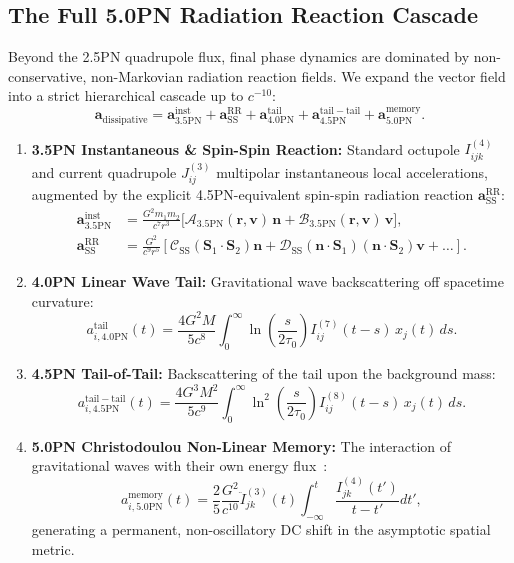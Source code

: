 \documentclass[11pt,a4paper,reqno]{article}
\theoremstyle{plain}
\theoremstyle{definition}
\theoremstyle{remark}
\numberwithin{equation}{section}
\begin{document}
\subsection{The Full 5.0PN Radiation Reaction Cascade}
Beyond the 2.5PN quadrupole flux, final phase dynamics are dominated by non-conservative, non-Markovian radiation reaction fields. We expand the vector field into a strict hierarchical cascade up to $c^{-10}$:
\begin{equation}
\label{eq:diss_field_cascade}
\bm{a}_{\mathrm{dissipative}} = \bm{a}_{3.5\mathrm{PN}}^{\mathrm{inst}} + \bm{a}_{\mathrm{SS}}^{\mathrm{RR}} + \bm{a}_{4.0\mathrm{PN}}^{\mathrm{tail}} + \bm{a}_{4.5\mathrm{PN}}^{\mathrm{tail-tail}} + \bm{a}_{5.0\mathrm{PN}}^{\mathrm{memory}}.
\end{equation}
\begin{enumerate}
    \item \textbf{3.5PN Instantaneous \& Spin-Spin Reaction:} Standard octupole $I_{ijk}^{(4)}$ and current quadrupole $J_{ij}^{(3)}$ multipolar instantaneous local accelerations, augmented by the explicit 4.5PN-equivalent spin-spin radiation reaction $\bm{a}_{\mathrm{SS}}^{\mathrm{RR}}$:
    \begin{align}
    \bm{a}_{3.5\mathrm{PN}}^{\mathrm{inst}} &= \frac{G^2 m_1 m_2}{c^7 r^3} \Big[ \mathcal{A}_{3.5\mathrm{PN}}(\bm{r}, \bm{v}) \, \bm{n} + \mathcal{B}_{3.5\mathrm{PN}}(\bm{r}, \bm{v}) \, \bm{v} \Big], \\
    \bm{a}_{\mathrm{SS}}^{\mathrm{RR}} &= \frac{G^2}{c^9 r^5} \left[ \mathcal{C}_{\mathrm{SS}}(\bm{S}_1 \cdot \bm{S}_2) \bm{n} + \mathcal{D}_{\mathrm{SS}} (\bm{n} \cdot \bm{S}_1)(\bm{n} \cdot \bm{S}_2) \bm{v} + \dots \right].
    \end{align}
    \item \textbf{4.0PN Linear Wave Tail:} Gravitational wave backscattering off spacetime curvature:
    \begin{equation}
    a_{i, 4.0\mathrm{PN}}^{\mathrm{tail}}(t) = \frac{4 G^2 M}{5 c^8} \int_0^\infty \ln\left( \frac{s}{2 \tau_0} \right) I_{ij}^{(7)}(t - s) \, x_j(t) \, ds.
    \end{equation}
    \item \textbf{4.5PN Tail-of-Tail:} Backscattering of the tail upon the background mass:
    \begin{equation}
    a_{i, 4.5\mathrm{PN}}^{\mathrm{tail-tail}}(t) = \frac{4 G^3 M^2}{5 c^9} \int_0^\infty \ln^2\left( \frac{s}{2 \tau_0} \right) I_{ij}^{(8)}(t - s) \, x_j(t) \, ds.
    \end{equation}
    \item \textbf{5.0PN Christodoulou Non-Linear Memory:} The interaction of gravitational waves with their own energy flux~\cite{Christodoulou1991,Blanchet2014}:
    \begin{equation}
    a_{i, 5.0\mathrm{PN}}^{\mathrm{memory}}(t) = \frac{2}{5} \frac{G^2}{c^{10}} \ddot{I}_{jk}^{(3)}(t) \int_{-\infty}^{t} \frac{I_{jk}^{(4)}(t')}{t - t'} dt',
    \end{equation}
    generating a permanent, non-oscillatory DC shift in the asymptotic spatial metric.
\end{enumerate}
\end{document}
